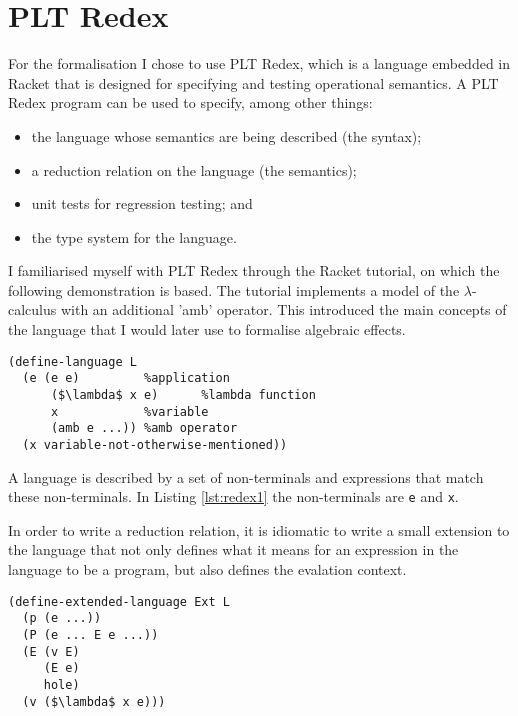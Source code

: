 \documentclass[12pt,a4paper,twoside,openright]{report}
\begin{document}
\section{PLT Redex}\label{prepplt}

For the formalisation I chose to use PLT Redex, which is a language embedded in Racket that is designed for specifying and testing operational semantics. A PLT Redex program can be used to specify, among other things:

\begin{itemize}
\item the language whose semantics are being described (the syntax);
\item a reduction relation on the language (the semantics);
\item unit tests for regression testing; and
\item the type system for the language.
\end{itemize}

I familiarised myself with PLT Redex through the Racket tutorial\cite{Tutorial}, on which the following demonstration is based. The tutorial implements a model of the $\lambda$-calculus with an additional 'amb' operator. This introduced the main concepts of the language that I would later use to formalise algebraic effects.

\begin{minipage}{\linewidth} \begin{lstlisting}[caption=Defining a language in PLT Redex,label={lst:redex1}]
(define-language L
  (e (e e)         %application
      ($\lambda$ x e)      %lambda function
      x            %variable
      (amb e ...)) %amb operator
  (x variable-not-otherwise-mentioned))
\end{lstlisting} \end{minipage}

A language is described by a set of non-terminals and expressions that match these non-terminals. In Listing \ref{lst:redex1} the non-terminals are \texttt{e} and \texttt{x}.

In order to write a reduction relation, it is idiomatic to write a small extension to the language that not only defines what it means for an expression in the language to be a program, but also defines the evalation context.

\begin{minipage}{\linewidth} \begin{lstlisting}[caption=An extended language based on L,label={lst:redex2}]
(define-extended-language Ext L
  (p (e ...))
  (P (e ... E e ...))
  (E (v E)
     (E e)
     hole)
  (v ($\lambda$ x e)))
\end{lstlisting} \end{minipage}
\end{document}
